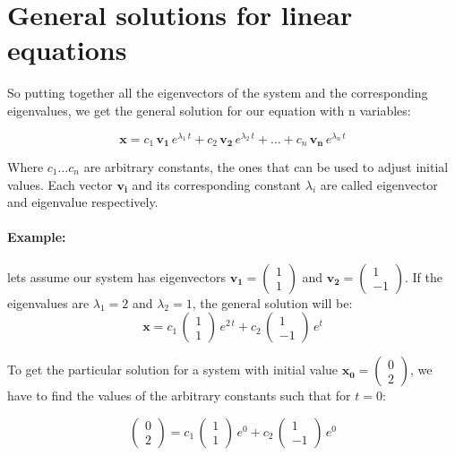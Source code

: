 \documentclass{tufte-book} %
\begin{document}
\section{General solutions for linear equations}

So putting together all the eigenvectors of the system and the corresponding eigenvalues, we get the general solution for our equation with n variables:


\begin{equation}
	\label{odenvar_mat_sol}
	\mathbf{x}= c_1 \, \mathbf{v_1} \, e^{\lambda_1 \, t} + c_2 \, \mathbf{v_2} \, e^{\lambda_2 \, t} +  \dots + c_n \, \mathbf{v_n} \, e^{\lambda_n \, t} 
\end{equation}

Where $c_1 \dots c_n$  are arbitrary constants, the ones that can be used to adjust initial values. Each vector $\mathbf{v_i}$ and its corresponding constant $\lambda_i$ are called eigenvector and eigenvalue respectively.
\paragraph{Example:} lets assume our system has eigenvectors $\mathbf{v_1}=\begin{pmatrix} 1 \\ 1 \end{pmatrix}$ and
	$\mathbf{v_2}=\begin{pmatrix} 1 \\ -1 \end{pmatrix}$. If the eigenvalues are $\lambda_1=2$ and $\lambda_2=1$, the general solution will be:
\begin{equation}
	\mathbf{x}= c_1 \, \begin{pmatrix} 1 \\ 1 \end{pmatrix} \, e^{2 \, t} + c_2 \, \begin{pmatrix} 1 \\ -1 \end{pmatrix} \, e^{ t} 
\end{equation}

To get the particular solution for a system with initial value $\mathbf{x_0}=\begin{pmatrix} 0 \\ 2 \end{pmatrix}$, we have to find the values of the arbitrary constants such that for $t=0$:

\begin{equation}
	\begin{pmatrix} 0 \\ 2 \end{pmatrix}= c_1 \, \begin{pmatrix} 1 \\ 1 \end{pmatrix} \, e^{0} + c_2 \, \begin{pmatrix} 1 \\ -1 \end{pmatrix} \, e^{0} 
\end{equation}
\end{document}

